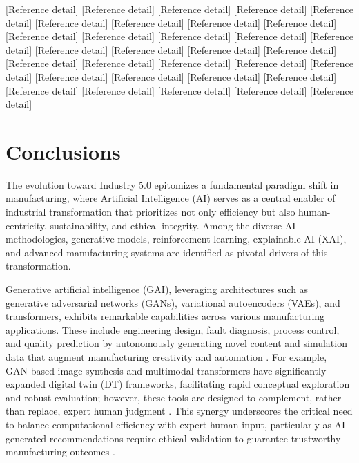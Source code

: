 \documentclass[sigconf]{acmart}
\begin{document}
\begin{thebibliography}{}

 [Reference detail]
 [Reference detail]
 [Reference detail]
 [Reference detail]
 [Reference detail]
 [Reference detail]
 [Reference detail]
 [Reference detail]
 [Reference detail]
 [Reference detail]
 [Reference detail]
 [Reference detail]
 [Reference detail]
 [Reference detail]
 [Reference detail]
 [Reference detail]
 [Reference detail]
 [Reference detail]
 [Reference detail]
 [Reference detail]
 [Reference detail]
 [Reference detail]
 [Reference detail]
 [Reference detail]
 [Reference detail]
 [Reference detail]
 [Reference detail]
 [Reference detail]
 [Reference detail]
 [Reference detail]
 [Reference detail]
 [Reference detail]

\end{thebibliography}

\section{Conclusions}

The evolution toward Industry 5.0 epitomizes a fundamental paradigm shift in manufacturing, where Artificial Intelligence (AI) serves as a central enabler of industrial transformation that prioritizes not only efficiency but also human-centricity, sustainability, and ethical integrity. Among the diverse AI methodologies, generative models, reinforcement learning, explainable AI (XAI), and advanced manufacturing systems are identified as pivotal drivers of this transformation.

Generative artificial intelligence (GAI), leveraging architectures such as generative adversarial networks (GANs), variational autoencoders (VAEs), and transformers, exhibits remarkable capabilities across various manufacturing applications. These include engineering design, fault diagnosis, process control, and quality prediction by autonomously generating novel content and simulation data that augment manufacturing creativity and automation \cite{ref1,ref5,ref24}. For example, GAN-based image synthesis and multimodal transformers have significantly expanded digital twin (DT) frameworks, facilitating rapid conceptual exploration and robust evaluation; however, these tools are designed to complement, rather than replace, expert human judgment \cite{ref6,ref14}. This synergy underscores the critical need to balance computational efficiency with expert human input, particularly as AI-generated recommendations require ethical validation to guarantee trustworthy manufacturing outcomes \cite{ref2}.
\end{document}
